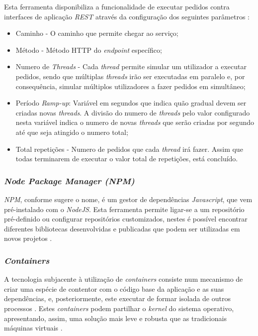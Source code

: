 Esta ferramenta disponibiliza a funcionalidade de executar pedidos contra interfaces de aplicação \emph{\acrshort{REST}} através da configuração dos seguintes parâmetros \cite{jmeter_load_testing}:
\begin{itemize}
    \item Caminho - O caminho que permite chegar ao serviço;
    \item Método - Método HTTP do \emph{endpoint} específico;
    \item Numero de \emph{Threads} - Cada \emph{thread} permite simular um utilizador a executar pedidos, sendo que múltiplas \emph{threads} irão ser executadas em paralelo e, por consequência, simular múltiplos utilizadores a fazer pedidos em simultâneo;
    \item Período \emph{Ramp-up}: Variável em segundos que indica quão gradual devem ser criadas novas \emph{threads}. A divisão do numero de \emph{threads} pelo valor configurado nesta variável indica o numero de novas \emph{threads} que serão criadas por segundo até que seja atingido o numero total;
    \item Total repetições - Numero de pedidos que cada \emph{thread} irá fazer. Assim que todas terminarem de executar o valor total de repetições, está concluído.
\end{itemize}

\subsubsection{\emph{Node Package Manager (NPM) \label{sym:npm}}\label{estado_arte_npm}}
\emph{NPM}, conforme sugere o nome, é um gestor de dependências \emph{Javascript}, que vem pré-instalado com o \emph{NodeJS}.
Esta ferramenta permite ligar-se a um repositório pré-definido ou configurar repositórios customizados, nestes é possível encontrar diferentes bibliotecas desenvolvidas e publicadas que podem ser utilizadas em novos projetos \cite{npm_explanation}.

\subsubsection{\emph{Containers} \label{estado_arte_containers}}
A tecnologia subjacente à utilização de \emph{containers} consiste num mecanismo de criar uma espécie de contentor com o código base da aplicação e as suas dependências, e, posteriormente, este executar de formar isolada de outros processos \cite{techradar_containers}.
Estes \emph{containers} podem partilhar o \emph{kernel} do sistema operativo, apresentando, assim, uma solução mais leve e robusta que as tradicionais máquinas virtuais \cite{microservices_and_containers}.

